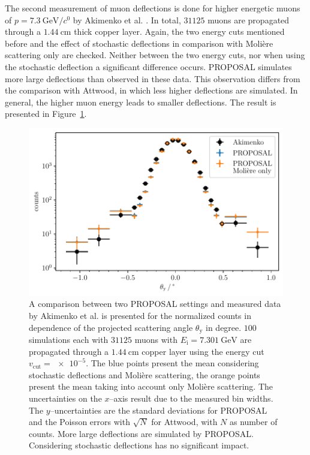 The second measurement of muon deflections is done for higher energetic muons 
of $p = \SI[per-mode=symbol]{7.3}{\giga\electronvolt\per\clight}$ by Akimenko et al. \cite{akimenko_1984}.
In total, $\num{31125}$ muons are propagated through a $\SI{1.44}{\centi\meter}$ thick 
copper layer. Again, the two energy cuts mentioned before and the effect of stochastic deflections 
in comparison with Molière scattering only are checked. 
Neither between the two energy cuts, nor when using the stochastic deflection a significant difference occurs. 
PROPOSAL simulates more large deflections than observed in these data. This observation differs from the comparison with Attwood, 
in which less higher deflections are simulated. In general, the higher muon energy 
leads to smaller deflections. The result is presented in Figure~\ref{fig:akimenko_comparison}.
\begin{figure}
    \centering 
    \includegraphics{../../deflection/plots/FINAL/akimenko_comparison_moliere_E7301MeV_final_multi_mean_deg.pdf}
    \caption{A comparison between two PROPOSAL settings and measured data by Akimenko et al. \cite{akimenko_1984} 
    is presented for the normalized counts in dependence of the projected scattering angle $\theta_{\mathrm{y}}$ in degree.
    $\num{100}$ simulations each with $\num{31125}$ muons with 
    $E_{\mathrm{i}} = \SI{7.301}{\giga\electronvolt}$ are propagated through a $\SI{1.44}{\centi\meter}$ 
    copper layer using the energy cut 
    $v_{\mathrm{cut}} = \num{e-5}$. The blue points present the mean considering stochastic deflections and Molière scattering, the orange points
    present the mean taking into account only Molière scattering. The uncertainties on the $x$--axis result due to the measured bin widths. The $y$--uncertainties are the standard deviations for PROPOSAL and the Poisson errors with $\sqrt{N}$ for Attwood, with $N$ as number of counts. More large deflections are simulated by PROPOSAL.
    Considering stochastic deflections has no significant impact.}
    \label{fig:akimenko_comparison}
\end{figure}

